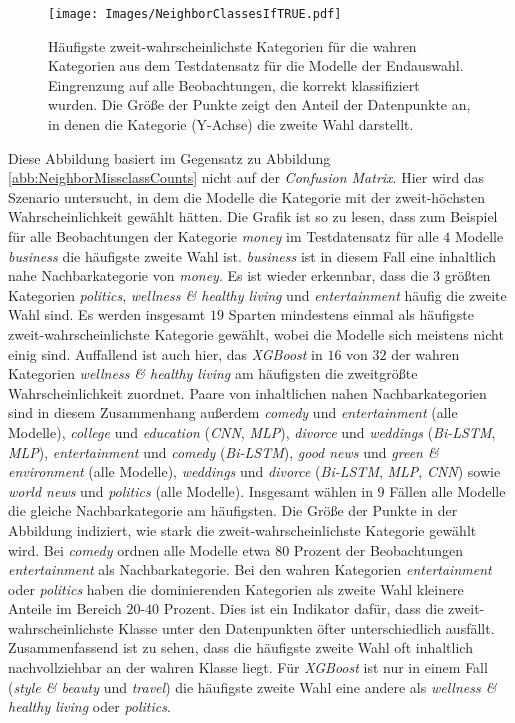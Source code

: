\documentclass[a4paper,11pt]{article}
\begin{document}
\begin{figure}[ht]
    \centering
\texttt{[image: Images/NeighborClassesIfTRUE.pdf]} 
\caption{Häufigste zweit-wahrscheinlichste Kategorien für die wahren Kategorien aus dem Testdatensatz für die Modelle der Endauswahl. Eingrenzung auf alle Beobachtungen, die korrekt klassifiziert wurden. Die Größe der Punkte zeigt den Anteil der Datenpunkte an, in denen die Kategorie (Y-Achse) die zweite Wahl darstellt.}
\label{abb:NeighborClassesIfTRUE}
\end{figure}

Diese Abbildung basiert im Gegensatz zu Abbildung  \ref{abb:NeighborMissclassCounts} nicht auf der \textit{Confusion Matrix}. Hier wird das Szenario untersucht, in dem die Modelle die Kategorie mit der zweit-höchsten Wahrscheinlichkeit gewählt hätten. Die Grafik ist so zu lesen, dass zum Beispiel für alle Beobachtungen der Kategorie \textit{money} im Testdatensatz für alle $4$ Modelle \textit{business} die häufigste zweite Wahl ist. \textit{business} ist in diesem Fall eine inhaltlich nahe Nachbarkategorie von \textit{money}.
Es ist wieder erkennbar, dass die $3$ größten Kategorien \textit{politics}, \textit{wellness \& healthy living} und \textit{entertainment} häufig die zweite Wahl sind. Es werden insgesamt $19$ Sparten mindestens einmal als häufigste zweit-wahrscheinlichste Kategorie gewählt, wobei die Modelle sich meistens nicht einig sind. Auffallend ist auch hier, das \textit{XGBoost} in $16$ von $32$ der wahren Kategorien \textit{wellness \& healthy living} am häufigsten die zweitgrößte Wahrscheinlichkeit zuordnet. Paare von inhaltlichen nahen Nachbarkategorien sind in diesem Zusammenhang außerdem \textit{comedy} und \textit{entertainment} (alle Modelle),
\textit{college} und \textit{education} (\textit{CNN}, \textit{MLP}), \textit{divorce} und \textit{weddings} (\textit{Bi-LSTM}, \textit{MLP}), \textit{entertainment} und \textit{comedy} (\textit{Bi-LSTM}), \textit{good news} und \textit{green \& environment} (alle Modelle), \textit{weddings} und \textit{divorce} (\textit{Bi-LSTM}, \textit{MLP}, \textit{CNN}) sowie \textit{world news} und \textit{politics} (alle Modelle). Insgesamt wählen in $9$ Fällen alle Modelle die gleiche Nachbarkategorie am häufigsten. Die Größe der Punkte in der Abbildung indiziert, wie stark die zweit-wahrscheinlichste Kategorie gewählt wird. Bei \textit{comedy} ordnen alle Modelle etwa $80$ Prozent der Beobachtungen \textit{entertainment} als Nachbarkategorie. Bei den wahren Kategorien \textit{entertainment} oder \textit{politics} haben die dominierenden Kategorien als zweite Wahl kleinere Anteile im Bereich $20$-$40$ Prozent. Dies ist ein Indikator dafür, dass die zweit-wahrscheinlichste Klasse unter den Datenpunkten öfter unterschiedlich ausfällt. Zusammenfassend ist zu sehen, dass die häufigste zweite Wahl oft inhaltlich nachvollziehbar an der wahren Klasse liegt. Für \textit{XGBoost} ist nur in einem Fall (\textit{style \& beauty} und \textit{travel}) die häufigste zweite Wahl eine andere als \textit{wellness \& healthy living} oder \textit{politics}.\\
\end{document}
